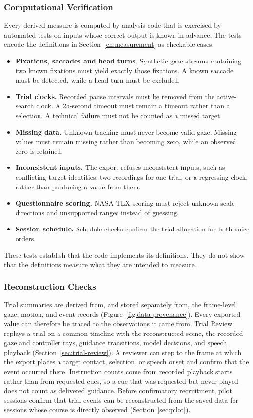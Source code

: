 \subsubsection{Computational Verification}
Every derived measure is computed by analysis code that is exercised by automated tests on inputs whose correct output is known in advance. The tests encode the definitions in Section~\ref{ch:measurement} as checkable cases.
\begin{itemize}
\item \textbf{Fixations, saccades and head turns.} Synthetic gaze streams containing two known fixations must yield exactly those fixations. A known saccade must be detected, while a head turn must be excluded.
\item \textbf{Trial clocks.} Recorded pause intervals must be removed from the active-search clock. A 25-second timeout must remain a timeout rather than a selection. A technical failure must not be counted as a missed target.
\item \textbf{Missing data.} Unknown tracking must never become valid gaze. Missing values must remain missing rather than becoming zero, while an observed zero is retained.
\item \textbf{Inconsistent inputs.} The export refuses inconsistent inputs, such as conflicting target identities, two recordings for one trial, or a regressing clock, rather than producing a value from them.
\item \textbf{Questionnaire scoring.} NASA-TLX scoring must reject unknown scale directions and unsupported ranges instead of guessing.
\item \textbf{Session schedule.} Schedule checks confirm the trial allocation for both voice orders.
\end{itemize}
These tests establish that the code implements its definitions. They do not show that the definitions measure what they are intended to measure.

\subsubsection{Reconstruction Checks}
Trial summaries are derived from, and stored separately from, the frame-level gaze, motion, and event records (Figure~\ref{fig:data-provenance}). Every exported value can therefore be traced to the observations it came from. Trial Review replays a trial on a common timeline with the reconstructed scene, the recorded gaze and controller rays, guidance transitions, model decisions, and speech playback (Section~\ref{sec:trial-review}). A reviewer can step to the frame at which the export places a target contact, selection, or speech onset and confirm that the event occurred there. Instruction counts come from recorded playback starts rather than from requested cues, so a cue that was requested but never played does not count as delivered guidance. Before confirmatory recruitment, pilot sessions confirm that trial events can be reconstructed from the saved data for sessions whose course is directly observed (Section~\ref{sec:pilot}).

